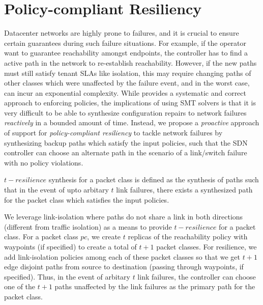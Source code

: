 \section{Policy-compliant Resiliency}
Datacenter networks are highly prone to failures, 
and it is crucial to ensure certain guarantees during such failure
situations. For example, if the operator want to guarantee
reachability amongst endpoints, the controller has to find a active
path in the network to re-establish reachability. However, if the new
paths must still satisfy tenant SLAs like isolation, this may require 
changing paths of other classes which were unaffected by the failure event,
and in the worst case, can incur an exponential complexity.
While \name provides a systematic and correct approach
to enforcing policies, the implications of using SMT solvers is that
it is very difficult to be able to synthesize configuration repairs to
network failures \emph{reactively} in a bounded amount of time. 
Instead, we propose a \emph{proactive} approach 
of support for \emph{policy-compliant resiliency} to tackle network failures
by synthesizing backup paths which satisfy the input policies, such that the SDN controller 
can choose an alternate path in the scenario of a link/switch failure with no
policy violations.

\begin{mydef}
	$t-resilience$ synthesis for a packet class is defined as the
	synthesis of paths such that in the event of upto arbitary
	$t$ link failures, there exists a synthesized path for the packet class which
	satisfies the input policies. 
\end{mydef}

We leverage link-isolation where paths do not share a link in both directions 
(different from traffic isolation)
 as a means to provide $t-resilience$ for a packet class. For a 
packet class $pc$, we create $t$ replicas of the reachability policy with waypoints (if specified)
to create a total of $t+1$ packet classes. For resilience, we add link-isolation policies among each
of these packet classes so that we get $t+1$ edge disjoint paths from source to destination
(passing through waypoints, if specified). Thus, in the event of arbitary $t$ link failures, the 
controller can choose one of the $t+1$ paths unaffected by the link failures as the primary
path for the packet class. 

